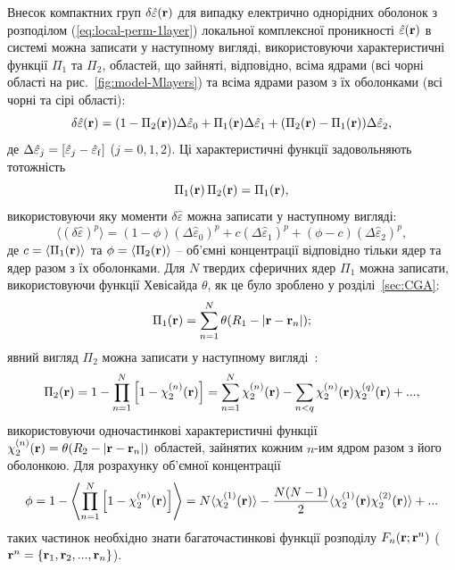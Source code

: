 \documentclass[14pt,twoside]{vakthesis}
\begin{document}
Внесок компактних груп $\delta\hat{\varepsilon}({\bf r})$ для  випадку електрично однорідних оболонок з розподілом (\ref{eq:local-perm-1layer}) локальної комплексної проникності $\hat{\varepsilon}({\bf r})$ в системі можна записати у наступному вигляді, використовуючи характеристичні функції $\Pi_1$ та $\Pi_2$, областей, що зайняті, відповідно, всіма ядрами (всі чорні області на рис.~\ref{fig:model-Mlayers}) та всіма ядрами разом з їх оболонками (всі чорні та сірі області):
\begin{equation}\label{eq:delta-eps-1layer}
\delta\hat{\varepsilon} ({\bf r}) = (1 - \Pi_2 ({\bf r})) \Delta\hat{\varepsilon}_0
+ \Pi_1 ({\bf r}) \Delta\hat{\varepsilon}_1
+ (\Pi_2 ({\bf r}) - \Pi_1 ({\bf r})) \Delta\hat{\varepsilon}_2,
\end{equation}
де $\Delta\hat{\varepsilon}_j = [\hat{\varepsilon}_j - 
\hat{\varepsilon}_{\rm f}]$ ($j = 0,1,2$). 
Ці характеристичні функції задовольняють тотожність $$\Pi_1({\bf r})\,\Pi_2({\bf r}) = \Pi_1({\bf r}),$$ використовуючи яку моменти $\delta\hat{\varepsilon}$ можна записати у наступному вигляді:
\begin{equation}\label{eq:moment-1layer}
\langle (\delta\hat{\varepsilon})^p \rangle = (1 - \phi) (\Delta\hat{\varepsilon}_0)^p 
+ c (\Delta\hat{\varepsilon}_1)^p
+ (\phi - c) (\Delta\hat{\varepsilon}_2)^p,
\end{equation}
де $c = \langle \Pi_1({\bf r}) \rangle$ та $\phi = \langle \Pi_2({\bf r}) \rangle$ -- об'ємні концентрації відповідно тільки ядер та ядер разом з їх оболонками. Для $N$ твердих сферичних ядер $\Pi_1$ можна записати, використовуючи функції Хевісайда $\theta$, як це було зроблено у розділі~\ref{sec:CGA}:
\begin{equation}\label{eq:Pi1}
	\Pi_1({\bf r}) = \sum_{n=1}^N \theta(R_1 - |{\bf r} - {\bf r}_n|);
\end{equation}
явний вигляд $\Pi_2$ можна записати у наступному вигляді~\cite{TorquatoCoreShell, Torquato}:
\begin{equation}\label{eq:Pi2}
\Pi_2 ({\bf r}) = 1 - \prod_{n=1}^{N}\left[ 1 - \chi_2^{(n)}({\bf r}) \right] = \sum_{n=1}^{N}\chi_2^{(n)}({\bf r}) - \sum_{n<q}\chi_2^{(n)}({\bf r})\chi_2^{(q)}({\bf r}) + ..., 
\end{equation}
використовуючи одночастинкові характеристичні функції $\chi^{(n)}_2({\bf r}) = \theta(R_2 - |{\bf r} - {\bf r}_n|)$ областей, зайнятих кожним $n$-им ядром разом з його оболонкою. Для розрахунку об'ємної концентрації 
\begin{equation}\label{eq:phi-full}
\phi = 1 - \left\langle \prod_{n=1}^{N}\left[ 1 - \chi_2^{(n)}({\bf r}) \right] \right\rangle = N \langle \chi_2^{(1)} ({\bf r}) \rangle
- \frac{N(N-1)}{2} \langle \chi_2^{(1)} ({\bf r}) \chi_2^{(2)} ({\bf r}) \rangle + ...
\end{equation}
таких частинок необхідно знати багаточастинкові функції розподілу $F_n({\bf r}; {\bf r}^n)$ (${\bf r}^n = \{{\bf r}_1, {\bf r}_2,..., {\bf r}_n\}$). 
\end{document}
